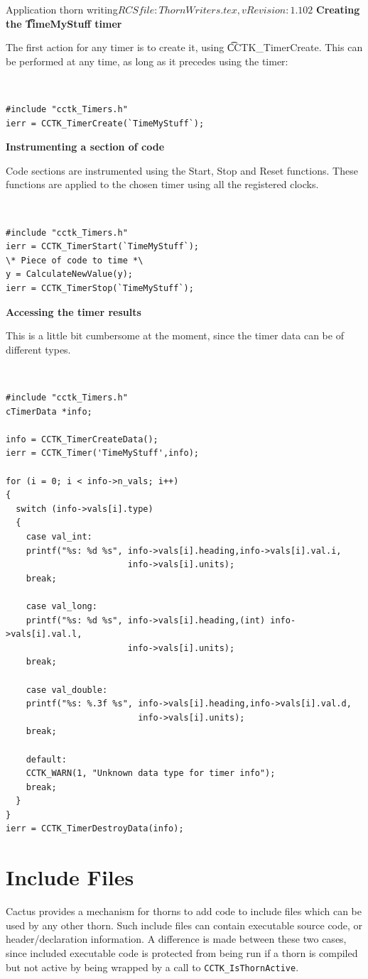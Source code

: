 \begin{cactuspart}{2}{Application thorn writing}{$RCSfile: ThornWriters.tex,v $}{$Revision: 1.102 $}
{\bf Creating the {\t TimeMyStuff} timer}

The first action for any timer is to create it, using {\t
CCTK\_TimerCreate}.  This can be performed at any time, as long as it
precedes using the timer:
{\tt
\begin{verbatim}
#include "cctk_Timers.h"
ierr = CCTK_TimerCreate(`TimeMyStuff`);
\end{verbatim}
}

{\bf Instrumenting a section of code}

Code sections are instrumented using the Start, Stop and Reset functions. These
functions are applied to the chosen timer using all the registered clocks.
{\tt
\begin{verbatim}
#include "cctk_Timers.h"
ierr = CCTK_TimerStart(`TimeMyStuff`);
\* Piece of code to time *\
y = CalculateNewValue(y);
ierr = CCTK_TimerStop(`TimeMyStuff`);
\end{verbatim}
}

{\bf Accessing the timer results}

This is a little bit cumbersome at the moment, since the timer data can be
of different types.

{\tt
\begin{verbatim}
#include "cctk_Timers.h"
cTimerData *info;

info = CCTK_TimerCreateData();
ierr = CCTK_Timer('TimeMyStuff',info);

for (i = 0; i < info->n_vals; i++)
{
  switch (info->vals[i].type)
  {
    case val_int:
    printf("%s: %d %s", info->vals[i].heading,info->vals[i].val.i,
                        info->vals[i].units);
    break;

    case val_long:
    printf("%s: %d %s", info->vals[i].heading,(int) info->vals[i].val.l,
                        info->vals[i].units);
    break;

    case val_double:
    printf("%s: %.3f %s", info->vals[i].heading,info->vals[i].val.d,
                          info->vals[i].units);
    break;

    default:
    CCTK_WARN(1, "Unknown data type for timer info");
    break;
  }
}
ierr = CCTK_TimerDestroyData(info);
\end{verbatim}
}


\section{Include Files}

Cactus provides a mechanism for thorns to add code to
include files which can be used by any other thorn.
Such include files can contain executable source code, or header/declaration
information. A difference is made between these two cases, since included
executable code is protected from being run if a thorn is compiled but
not active by being wrapped by a call to {\tt CCTK\_IsThornActive}.



\end{cactuspart}
